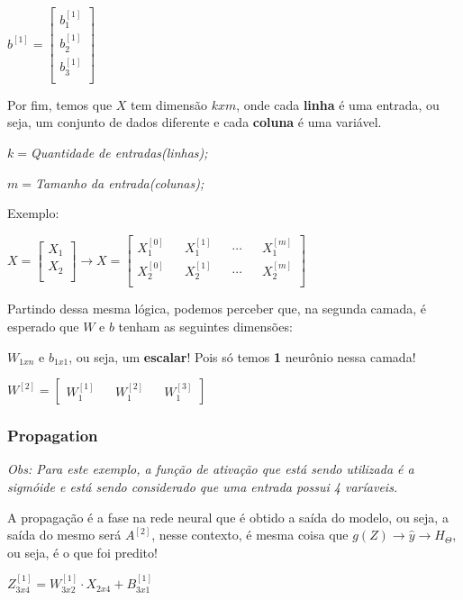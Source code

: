 \documentclass[12pt]{article}
\begin{document}
\(b^{[1]}=\begin{bmatrix}  b_1^{[1]} \\  b_2^{[1]} \\  b_3^{[1]} \\  \end{bmatrix}\)

Por fim, temos que \(X\) tem dimensão \(kxm\), onde cada \textbf{linha}
é uma entrada, ou seja, um conjunto de dados diferente e cada
\textbf{coluna} é uma variável.

$k= $\emph{Quantidade de entradas(linhas);}

$m = $\emph{Tamanho da entrada(colunas);}

Exemplo:

$X = 
\begin{bmatrix}  
	X_1 \\  X_2 \\  
\end{bmatrix} 
\rightarrow 
X = 
\begin{bmatrix}  
	X_1^{[0]} && X_1^{[1]} && \cdots && X_1^{[m]} \\  
	X_2^{[0]} && X_2^{[1]} && \cdots && X_2^{[m]} \\  
\end{bmatrix}$

Partindo dessa mesma lógica, podemos perceber que, na segunda camada, é
esperado que \(W\) e \(b\) tenham as seguintes dimensões:

\(W_{1xn}\) e \(b_{1x1}\), ou seja, um \textbf{escalar}! Pois só temos
\textbf{1} neurônio nessa camada!

$W^{[2]} = 
\begin{bmatrix}  
	W_1^{[1]} && W_1^{[2]} && W_1^{[3]}
\end{bmatrix} 
$

\hypertarget{propagation}{%
\subsubsection{Propagation}\label{propagation}}

\emph{Obs: Para este exemplo, a função de ativação que está sendo
utilizada é a sigmóide e está sendo considerado que uma entrada possui 4
varíaveis.}

A propagação é a fase na rede neural que é obtido a saída do modelo, ou
seja, a saída do mesmo será \(A^{[2]}\), nesse contexto, é mesma coisa
que \(g(Z) \rightarrow \hat{y} \rightarrow H_{\Theta}\), ou seja, é o
que foi predito!

\(Z^{[1]}_{3x4} = W^{[1]}_{3x2} \cdot X_{2x4} + B^{[1]}_{3x1}\)
\end{document}
